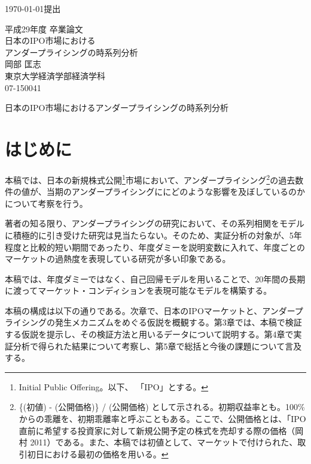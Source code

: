 \documentclass{jsarticle}
\begin{document}
\renewcommand\thefootnote{\arabic{footnote})}



{\Large \today 提出}\\ %

\begin{center}
\vspace{120truept}
{\huge 平成29年度 卒業論文\\[10mm]
日本のIPO市場における\\アンダープライシングの時系列分析}\\ %
\vspace{120truept}
{\huge 岡部 匡志\\
\vspace{50truept}
東京大学経済学部経済学科\\
\vspace{50truept}
07-150041}\\ %

\end{center}
\newpage
\begin{center}
{\Large 日本のIPO市場におけるアンダープライシングの時系列分析}\\ %
\end{center}

\tableofcontents

\vspace{50truept}
\section{はじめに}
本稿では、日本の新規株式公開\footnote[1]{Initial Public Offering。以下、 「IPO」とする。}市場において、アンダープライシング\footnote[2]{\{(初値) - (公開価格)\} / (公開価格) として示される。初期収益率とも。100\%からの乖離を、初期乖離率と呼ぶこともある。ここで、公開価格とは、「IPO直前に希望する投資家に対して新規公開予定の株式を売却する際の価格（岡村 2011\cite{okamura}）である。また、本稿では初値として、マーケットで付けられた、取引初日における最初の価格を用いる。}の過去数件の値が、当期のアンダープライシングににどのような影響を及ぼしているのかについて考察を行う。\par
著者の知る限り、アンダープライシングの研究において、その系列相関をモデルに積極的に引き受けた研究は見当たらない。そのため、実証分析の対象が、5年程度と比較的短い期間であったり、年度ダミーを説明変数に入れて、年度ごとのマーケットの過熱度を表現している研究が多い印象である。\par
本稿では、年度ダミーではなく、自己回帰モデルを用いることで、20年間の長期に渡ってマーケット・コンディションを表現可能なモデルを構築する。\par
本稿の構成は以下の通りである。次章で、日本のIPOマーケットと、アンダープライシングの発生メカニズムをめぐる仮説を概観する。第3章では、本稿で検証する仮説を提示し、その検証方法と用いるデータについて説明する。第4章で実証分析で得られた結果について考察し、第5章で総括と今後の課題について言及する。
\end{document}
